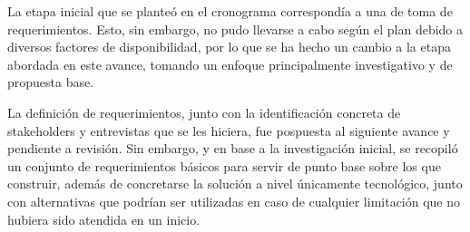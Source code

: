\documentclass[
	spanish, %
	letterpaper, oneside
]{article}
\begin{document}
\templatePortrait

\templatePagecfg

\begin{abstractd}
	La etapa inicial que se planteó en el cronograma correspondía a una de toma de requerimientos. Esto, sin embargo, no pudo llevarse a cabo según el plan debido a diversos factores de disponibilidad, por lo que se ha hecho un cambio a la etapa abordada en este avance, tomando un enfoque principalmente investigativo y de propuesta base.

	La definición de requerimientos, junto con la identificación concreta de stakeholders y entrevistas que se les hiciera, fue pospuesta al siguiente avance y pendiente a revisión. Sin embargo, y en base a la investigación inicial, se recopiló un conjunto de requerimientos básicos para servir de punto base sobre los que construir, además de concretarse la solución a nivel únicamente tecnológico, junto con alternativas que podrían ser utilizadas en caso de cualquier limitación que no hubiera sido atendida en un inicio.

\end{abstractd}

\templateIndex

\templateFinalcfg










\nocite{alberdi_2020}
\nocite{sharif_2022}
\nocite{schwaber2020scrum}
\nocite{Anonymous}



\end{document}
